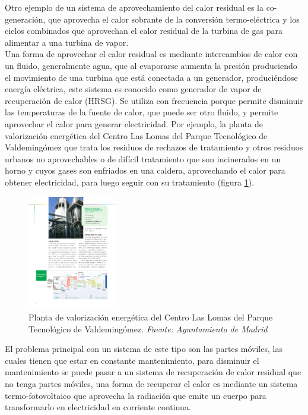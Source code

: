 Otro ejemplo de un sistema de aprovechamiento del calor residual es la co-generación, que aprovecha el calor sobrante de la conversión termo-eléctrica y los ciclos combinados que aprovechan el calor residual de la turbina de gas para alimentar a una turbina de vapor.\\

Una forma de aprovechar el calor residual es mediante intercambios de calor con un fluido, generalmente agua, que al evaporarse aumenta la presión produciendo el movimiento de una turbina que está conectada a un generador, produciéndose energía eléctrica, este sistema es conocido como generador de vapor de recuperación de calor (HRSG). Se utiliza con frecuencia porque permite disminuir las temperaturas de la fuente de calor, que puede ser otro fluido, y permite aprovechar el calor para generar electricidad. Por ejemplo, la  planta de valorización energética del Centro Las Lomas del Parque Tecnológico de Valdemingómez que trata los residuos de rechazos de tratamiento y otros residuos urbanos no aprovechables o de difícil tratamiento que son incinerados en un horno y cuyos gases son enfriados en una caldera, aprovechando el calor para obtener electricidad, para luego seguir con su tratamiento (figura \ref{fig:esquemaslomasvalorizacion}).\\

\begin{figure}[H]
	\centering
	\includegraphics[height=5cm]{figuras/esquemasLomasValorizacion}
	\caption{Planta de valorización energética del Centro Las Lomas del Parque Tecnológico de Valdemingómez. \textit{Fuente: Ayuntamiento de Madrid}}
	\label{fig:esquemaslomasvalorizacion}
\end{figure}

El problema principal con un sistema de este tipo son las partes móviles, las cuales tienen que estar en constante mantenimiento, para disminuir el mantenimiento se puede pasar a un sistema de recuperación de calor residual que no tenga partes móviles, una forma de recuperar el calor es mediante un sistema termo-fotovoltaico que aprovecha la radiación que emite un cuerpo para transformarlo en electricidad en corriente continua.




